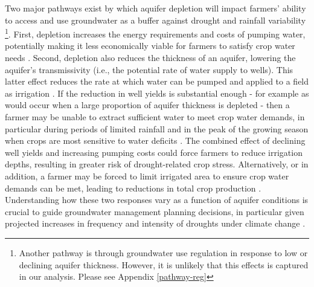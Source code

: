 \documentclass[
]{article}
\begin{document}
Two major pathways exist by which aquifer depletion will impact farmers' ability to access and use groundwater as a buffer against drought and rainfall variability \citep{foster2015analysis}\footnote{Another pathway is through groundwater use regulation in response to low or declining aquifer thickness. However, it is unlikely that this effects is captured in our analysis. Please see Appendix \ref{pathway-reg}}. First, depletion increases the energy requirements and costs of pumping water, potentially making it less economically viable for farmers to satisfy crop water needs \citep{mieno2017price, bhattarai2021impact}. Second, depletion also reduces the thickness of an aquifer, lowering the aquifer's transmissivity (i.e., the potential rate of water supply to wells). This latter effect reduces the rate at which water can be pumped and applied to a field as irrigation \citep{konikow2005groundwater, foster2014modeling, hrozencik2017heterogeneous}. If the reduction in well yields is substantial enough - for example as would occur when a large proportion of aquifer thickness is depleted \citep{hecox2002calculation, korus2020depletion} - then a farmer may be unable to extract sufficient water to meet crop water demands, in particular during periods of limited rainfall and in the peak of the growing season when crops are most sensitive to water deficits \citep{foster2015well,rouhi2020downside}. The combined effect of declining well yields and increasing pumping costs could force farmers to reduce irrigation depths, resulting in greater risk of drought-related crop stress. Alternatively, or in addition, a farmer may be forced to limit irrigated area to ensure crop water demands can be met, leading to reductions in total crop production \citep{foster2014modeling, rad2020effects}. Understanding how these two responses vary as a function of aquifer conditions is crucial to guide groundwater management planning decisions, in particular given projected increases in frequency and intensity of droughts under climate change \citep{ukkola2020robust, chiang2021evidence, cook2020twenty}.  
\end{document}
